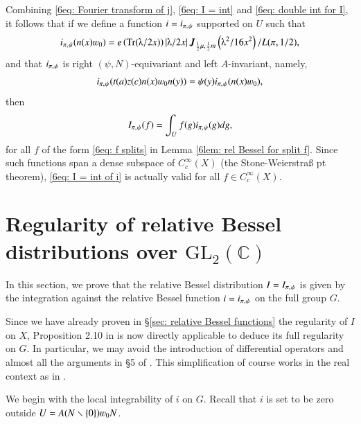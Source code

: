 \documentclass{amsproc}
\newcommand{\BC}{{\mathbb {C}}} \newcommand{\BD}{{\mathbb {D}}}
\newcommand{\GL}{{\mathrm {GL}}} \newcommand{\PGL}{{\mathrm {PGL}}}
\def\lp {\left (}
\def\rp {\right )}
\def\bfJ {\boldsymbol J}
\def\shskip{\hskip 0.5 pt}
\theoremstyle{plain}
\numberwithin{equation}{section}
\begin{document}
Combining \eqref{6eq: Fourier transform of j}, \eqref{6eq: I = int} and \eqref{6eq: double int for I}, it follows that if we define a function $i = i_{\pi, \shskip \psi}$ supported on $U$ such that
\begin{align}\label{6eq: defn of i}
i_{\pi, \shskip \psi} ( n(x)  \varw_0  ) =     e \lp \Tr ({\lambdaup} / {2 x} )  \rp \left| \lambdaup / 2 x \right|  \bfJ_{\frac 1 2 \mu,\shskip  \frac 1 2 m} \lp \lambdaup^2 / 16 x^2 \rp / {L (\pi, 1/2)},
\end{align}
and that $i_{\pi, \shskip \psi}$ is   right $  (\psi, N)$-equivariant and left $A$-invariant, namely,
\begin{align}\label{eq: equivariance of i}
i_{\pi, \shskip \psi} (t(a) z(c) n(x) \varw_0 n(y)) = \psi (y) i_{\pi, \shskip \psi} ( n(x)  \varw_0  ),
\end{align}
then
\begin{align}\label{6eq: I = int of i}
I_{\pi, \shskip \psi} (f) =  \int_{U} f (g)  i_{\pi, \shskip \psi} (g) d g,
\end{align}
for all $f $ of the form  \eqref{6eq: f splits} in Lemma \ref{6lem: rel Bessel for split f}. Since such functions  span a dense subspace of $ C_c^{\infty} (X)$ (the Stone-Weierstra\ss {} pt theorem), \eqref{6eq: I = int of i} is actually valid for all $f \in C_c^{\infty} (X)$.



\section{Regularity of relative Bessel distributions over $\GL_2 (\BC)$}\label{sec: regularity relative}
In this section, we prove that the relative Bessel distribution $I = I_{\pi, \shskip \psi}$ is given by the integration against the relative Bessel function $i = i_{\pi,\shskip \psi}$ on the full group $G$.


Since we have already proven in \S \ref{sec: relative Bessel functions} the regularity of $I$ on $X$,  Proposition 2.10 in \cite{Shalika-MO} is now directly applicable to deduce its full regularity on $G$. In particular, we may avoid the introduction of   differential operators and almost all the arguments in \S 5 of \cite{BaruchMao-Real}. This simplification of course  works in the real context as in \cite{BaruchMao-Real}.

We begin with the local integrability of $i $ on $G$. Recall that  $i $ is set to be zero outside $  U =  A (N \smallsetminus \{0\} ) \varw_0 N $.
\end{document}
